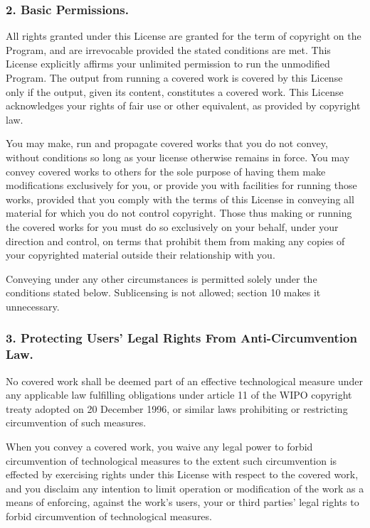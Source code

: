 \subsubsection{2. Basic Permissions.}
All rights granted under this License are granted for the term of copyright on the Program, and are irrevocable provided the stated conditions are met. This License explicitly affirms your unlimited permission to run the unmodified Program. The output from running a covered work is covered by this License only if the output, given its content, constitutes a covered work. This License acknowledges your rights of fair use or other equivalent, as provided by copyright law.\par
You may make, run and propagate covered works that you do not convey, without conditions so long as your license otherwise remains in force. You may convey covered works to others for the sole purpose of having them make modifications exclusively for you, or provide you with facilities for running those works, provided that you comply with the terms of this License in conveying all material for which you do not control copyright. Those thus making or running the covered works for you must do so exclusively on your behalf, under your direction and control, on terms that prohibit them from making any copies of your copyrighted material outside their relationship with you.\par
Conveying under any other circumstances is permitted solely under the conditions stated below. Sublicensing is not allowed; section 10 makes it unnecessary.
\subsubsection{3. Protecting Users' Legal Rights From Anti-Circumvention Law.}
No covered work shall be deemed part of an effective technological measure under any applicable law fulfilling obligations under article 11 of the WIPO copyright treaty adopted on 20 December 1996, or similar laws prohibiting or restricting circumvention of such measures.\par
When you convey a covered work, you waive any legal power to forbid circumvention of technological measures to the extent such circumvention is effected by exercising rights under this License with respect to the covered work, and you disclaim any intention to limit operation or modification of the work as a means of enforcing, against the work's users, your or third parties' legal rights to forbid circumvention of technological measures.
